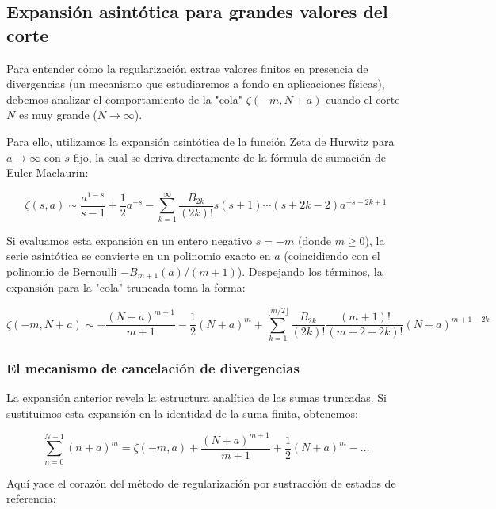 \subsection{Expansión asintótica para grandes valores del corte}

Para entender cómo la regularización extrae valores finitos en presencia de divergencias (un mecanismo que estudiaremos a fondo en aplicaciones físicas), debemos analizar el comportamiento de la "cola" $\zeta(-m, N+a)$ cuando el corte $N$ es muy grande ($N \to \infty$). 

Para ello, utilizamos la expansión asintótica de la función Zeta de Hurwitz para $a \to \infty$ con $s$ fijo, la cual se deriva directamente de la fórmula de sumación de Euler-Maclaurin:

$$ \zeta(s, a) \sim \frac{a^{1-s}}{s-1} + \frac{1}{2}a^{-s} - \sum_{k=1}^{\infty} \frac{B_{2k}}{(2k)!} s(s+1)\cdots(s+2k-2) a^{-s-2k+1} $$

Si evaluamos esta expansión en un entero negativo $s = -m$ (donde $m \ge 0$), la serie asintótica se convierte en un polinomio exacto en $a$ (coincidiendo con el polinomio de Bernoulli $-B_{m+1}(a)/(m+1)$). Despejando los términos, la expansión para la "cola" truncada toma la forma:

$$ \zeta(-m, N+a) \sim -\frac{(N+a)^{m+1}}{m+1} - \frac{1}{2}(N+a)^m + \sum_{k=1}^{\lfloor m/2 \rfloor} \frac{B_{2k}}{(2k)!} \frac{(m+1)!}{(m+2-2k)!} (N+a)^{m+1-2k} $$

\subsubsection{El mecanismo de cancelación de divergencias}

La expansión anterior revela la estructura analítica de las sumas truncadas. Si sustituimos esta expansión en la identidad de la suma finita, obtenemos:

$$ \sum_{n=0}^{N-1} (n+a)^m = \zeta(-m, a) + \frac{(N+a)^{m+1}}{m+1} + \frac{1}{2}(N+a)^m - \dots $$

Aquí yace el corazón del método de regularización por sustracción de estados de referencia:

